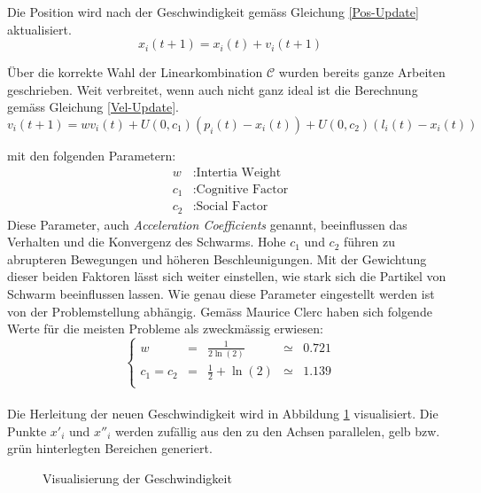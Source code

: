 Die Position wird nach der Geschwindigkeit gemäss Gleichung \ref{Pos-Update} aktualisiert. \\
\begin{equation}
	x_{i}(t+1) = x_i(t) + v_i(t+1) \label{Pos-Update}
\end{equation}

Über die korrekte Wahl der Linearkombination $\mathcal{C}$ wurden bereits ganze Arbeiten geschrieben. Weit verbreitet, wenn auch nicht ganz ideal ist die Berechnung gemäss Gleichung \ref{Vel-Update}. \\
\begin{equation}
	v_i(t+1) = w v_i(t) + U(0,c_1) (p_i(t)-x_i(t)) + U(0,c_2) (l_i(t)-x_i(t))\label{Vel-Update}
\end{equation}

mit den folgenden Parametern:
\begin{align*}
	w &: \text{Intertia Weight} \\
	c_1 &: \text{Cognitive Factor} \\
	c_2 &: \text{Social Factor}
\end{align*}
Diese Parameter, auch \textit{Acceleration Coefficients} genannt, beeinflussen das  Verhalten und die Konvergenz des Schwarms. Hohe $c_1$ und $c_2$ führen zu abrupteren Bewegungen und höheren Beschleunigungen. Mit der Gewichtung dieser beiden Faktoren lässt sich weiter einstellen, wie stark sich die Partikel von Schwarm beeinflussen lassen. Wie genau diese Parameter eingestellt werden ist von der Problemstellung abhängig. Gemäss Maurice Clerc \cite{Clerc-Stagnation} haben sich folgende Werte für die meisten Probleme als zweckmässig erwiesen:
\begin{equation}
	\left\lbrace \begin{array}{lllll}
		w & = & \frac{1}{2 \ln(2)} & \simeq & 0.721 \\
		c_1 = c_2 & = & \frac{1}{2} + \ln(2) & \simeq & 1.139 \\
	\end{array}	\right. 
\end{equation} \\


Die Herleitung der neuen Geschwindigkeit wird in Abbildung \ref{Fig-Visualisierung-Geschwindigkeit} visualisiert. Die Punkte $x'_i$ und $x''_i$ werden zufällig aus den zu den Achsen parallelen, gelb bzw. grün hinterlegten Bereichen generiert.  \\
\begin{figure}[htbp]
	\centering
	
	\caption{Visualisierung der Geschwindigkeit}
	\label{Fig-Visualisierung-Geschwindigkeit}
\end{figure}


